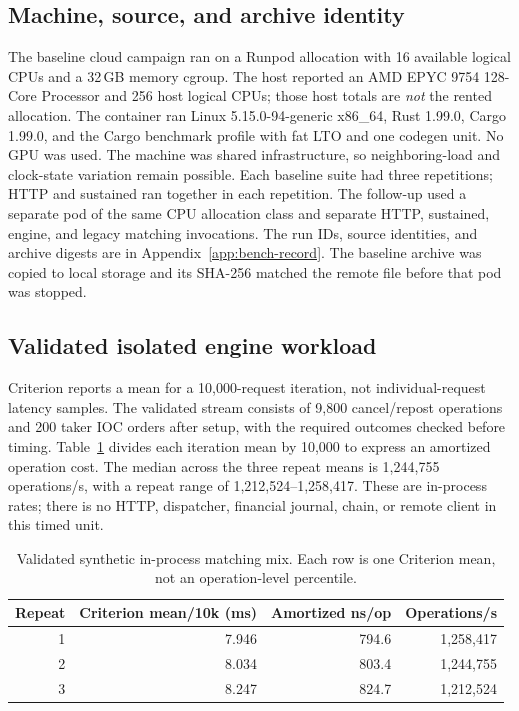 \documentclass[envcountsame,runningheads,notitlepage]{llncs}
\newcommand{\pathref}[1]{\texttt{\detokenize{#1}}}
\begin{document}
\subsection{Machine, source, and archive identity}
The baseline cloud campaign ran on a Runpod \pathref{cpu3c} allocation with 16 available logical CPUs and a 32\,GB memory cgroup. The host reported an AMD EPYC 9754 128-Core Processor and 256 host logical CPUs; those host totals are \emph{not} the rented allocation. The container ran Linux 5.15.0-94-generic x86\_64, Rust 1.99.0, Cargo 1.99.0, and the Cargo benchmark profile with fat LTO and one codegen unit. No GPU was used. The machine was shared infrastructure, so neighboring-load and clock-state variation remain possible. Each baseline suite had three repetitions; HTTP and sustained ran together in each repetition. The follow-up used a separate pod of the same CPU allocation class and separate HTTP, sustained, engine, and legacy matching invocations. The run IDs, source identities, and archive digests are in Appendix~\ref{app:bench-record}. The baseline archive was copied to local storage and its SHA-256 matched the remote file before that pod was stopped.\cite{benchdata,rebenchdata}

\subsection{Validated isolated engine workload}
Criterion reports a mean for a 10,000-request iteration, not individual-request latency samples. The validated stream consists of 9,800 cancel/repost operations and 200 taker IOC orders after setup, with the required outcomes checked before timing. Table~\ref{tab:engine-results} divides each iteration mean by 10,000 to express an amortized operation cost. The median across the three repeat means is 1,244,755 operations/s, with a repeat range of 1,212,524--1,258,417. These are in-process \pathref{MatchingEngine::process} rates; there is no HTTP, dispatcher, financial journal, chain, or remote client in this timed unit.\cite{benchdata}

\begin{table}[h]
\centering\small
\begin{tabular}{rrrr}
\toprule
Repeat & Criterion mean/10k (ms) & Amortized ns/op & Operations/s \\
\midrule
1 & 7.946 & 794.6 & 1,258,417 \\
2 & 8.034 & 803.4 & 1,244,755 \\
3 & 8.247 & 824.7 & 1,212,524 \\
\bottomrule
\end{tabular}
\caption{Validated synthetic in-process matching mix. Each row is one Criterion mean, not an operation-level percentile.}\label{tab:engine-results}
\end{table}
\end{document}
